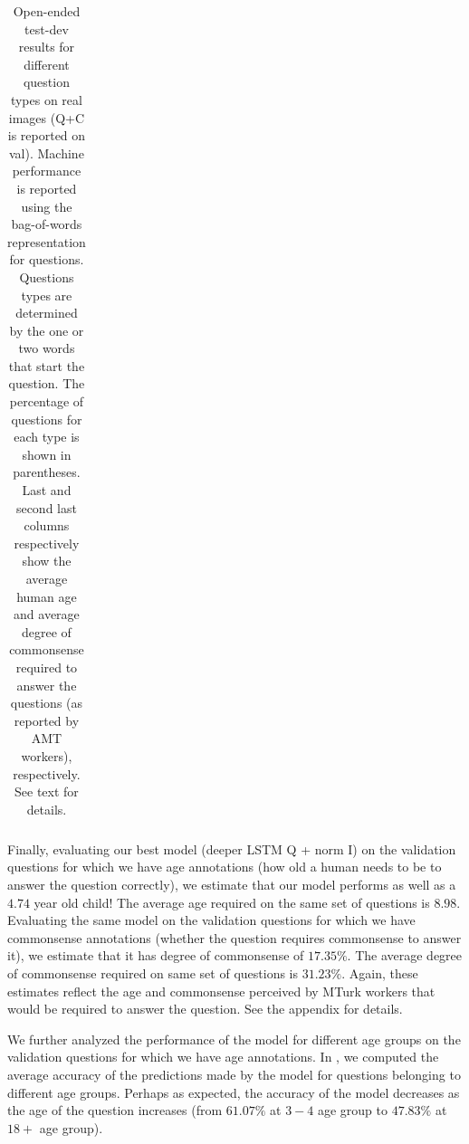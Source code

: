 \begin{table}[h]
\begin{center}
\begin{tabular}{@{} l  c  c  c  c c c c@{}  }
\bottomrule
\end{tabular}
\caption{Open-ended test-dev results for different question types on real images (Q+C is reported on val).
Machine performance is reported using the bag-of-words representation for questions.
Questions types are determined by the one or two words that start the question. 
The percentage of questions for each type is shown in parentheses. 
Last and second last columns respectively show the average human age and average degree of commonsense required to answer the questions 
(as reported by AMT workers), respectively. 
See text for details.}
\vspace{-10pt}
\label{tab:typeacc}
\end{center}
\end{table}


Finally, evaluating our best model (deeper LSTM Q + norm I) on the validation questions for which we have age annotations (how old a human needs to be to answer the question correctly), we estimate that our model performs as well as a $4.74$ year old child! The average age required on the same set of questions is $8.98$. Evaluating the same model on the validation questions for which we have commonsense annotations (whether the question requires commonsense to answer it), we estimate that it has degree of commonsense of $17.35\%$. The average degree of commonsense required on same set of questions is $31.23\%$. Again, these estimates reflect the age and commonsense perceived by MTurk workers that would be required to answer the question. See the appendix for details. 

We further analyzed the performance of the model for different age groups on the validation questions for which we have age annotations. In , we computed the average accuracy of the predictions made by the model for questions belonging to different age groups. Perhaps as expected, the accuracy of the model decreases as the age of the question increases (from $61.07\%$ at $3-4$ age group to $47.83\%$ at $18+$ age group). 

